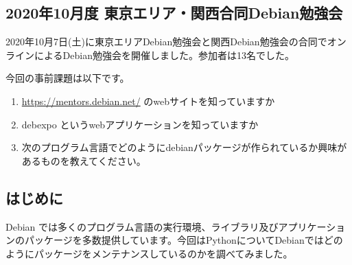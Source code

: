 \documentclass[mingoth,a4paper]{jsarticle}
\begin{document}

\subsection{2020年10月度 東京エリア・関西合同Debian勉強会}

2020年10月7日(土)に東京エリアDebian勉強会と関西Debian勉強会の合同でオンラインによるDebian勉強会を開催しました。参加者は13名でした。



今回の事前課題は以下です。

\begin{enumerate}
\item \url{https://mentors.debian.net/} のwebサイトを知っていますか
\item debexpo というwebアプリケーションを知っていますか
\item 次のプログラム言語でどのようにdebianパッケージが作られているか興味があるものを教えてください。
\end{enumerate}


\begin{multicols}{2}
{\small

}
\end{multicols}

%
%
%
%





\subsection{はじめに}

Debian では多くのプログラム言語の実行環境、ライブラリ及びアプリケーションのパッケージを多数提供しています。今回はPythonについてDebianではどのようにパッケージをメンテナンスしているのかを調べてみました。
\end{document}
